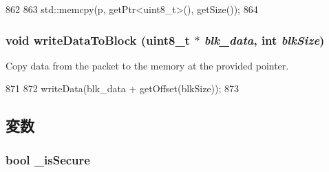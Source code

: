 \begin{DoxyCode}
862     {
863         std::memcpy(p, getPtr<uint8_t>(), getSize());
864     }
\end{DoxyCode}
\hypertarget{classPacket_ac14ab45b04f07f4aca586b773f2252db}{
\subsubsection[{writeDataToBlock}]{\setlength{\rightskip}{0pt plus 5cm}void writeDataToBlock (uint8\_\-t $\ast$ {\em blk\_\-data}, \/  int {\em blkSize})}}
\label{classPacket_ac14ab45b04f07f4aca586b773f2252db}
Copy data from the packet to the memory at the provided pointer. 


\begin{DoxyCode}
871     {
872         writeData(blk_data + getOffset(blkSize));
873     }
\end{DoxyCode}


\subsection{変数}
\hypertarget{classPacket_a8575be38d53d73568838d5805df1cf63}{
\subsubsection[{\_\-isSecure}]{\setlength{\rightskip}{0pt plus 5cm}bool {\bf \_\-isSecure}}}
\label{classPacket_a8575be38d53d73568838d5805df1cf63}


